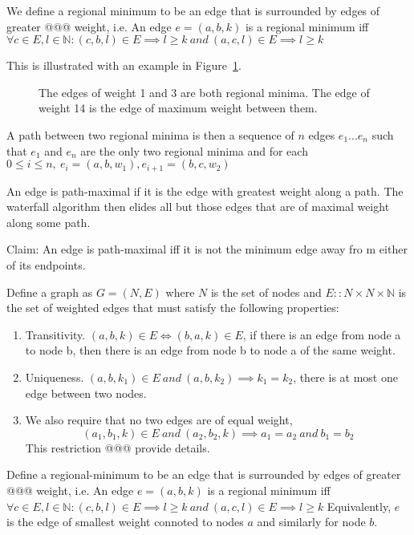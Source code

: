 \documentclass{jfp}
\begin{document}
We define a regional minimum to be an edge that is surrounded by edges of greater @@@
weight, i.e.
An edge $e = (a,b,k)$ is a regional minimum iff
$\forall c \in E, l \in \mathbb{N} :
  (c,b,l) \in E \implies l \geq k\ and\
  (a,c,l) \in E \implies l \geq k $


This is illustrated with an example in Figure~\ref{fig:regmin}.

\begin{figure}
\centering
\ifpdf
\else
\fi
\caption{The edges of weight 1 and 3 are both regional minima. The
edge of weight 14 is the edge of maximum weight between them.}
\label{fig:regmin}
\end{figure}

A path between two regional minima is then a sequence of $n$ edges $e_1 ... e_n$
such that $e_1$ and $e_n$ are the only two regional minima
and for each $ 0 \leq i \le n,\ e_i = (a,b,w_1) , e_{i+1} = (b,c,w_2)$

\noindent An edge is path-maximal if it is the edge with greatest weight along a
 path.
The waterfall algorithm then elides all but those edges that are of maximal weight along some path.

\noindent Claim: An edge is path-maximal iff it is not the minimum edge away fro
m either of its endpoints.



Define a graph as $G = (N,E)$
where $N$ is the set of nodes and $E :: N\times N \times \mathbb{N}$ is the set of weighted edges
that must satisfy the following properties:
\begin{enumerate}

\item Transitivity. $(a,b,k) \in E \iff (b,a,k) \in E$, if there is an
  edge from node a to node b, then there is an edge from node b to
  node a of the same weight.

\item Uniqueness.  $(a,b,k_1) \in E\ and\ (a,b,k_2) \implies k_1 =
  k_2$, there is at most one edge between two nodes.

\item We also require that no two edges are of equal weight,
  \[
  (a_1,b_1,k) \in E\ and\ (a_2,b_2,k) \implies a_1 = a_2\ and\ b_1 =
  b_2
  \]
  This restriction @@@ provide details.

\end{enumerate}

Define a regional-minimum to be an edge that is surrounded by edges of
greater @@@ weight, i.e.  An edge $e = (a,b,k)$ is a regional minimum iff
$\forall c \in E, l \in \mathbb{N} : (c,b,l) \in E \implies l \geq
k\ and\ (a,c,l) \in E \implies l \geq k $ Equivalently, $e$ is the
edge of smallest weight connoted to nodes $a$ and similarly for node
$b$.
\end{document}
